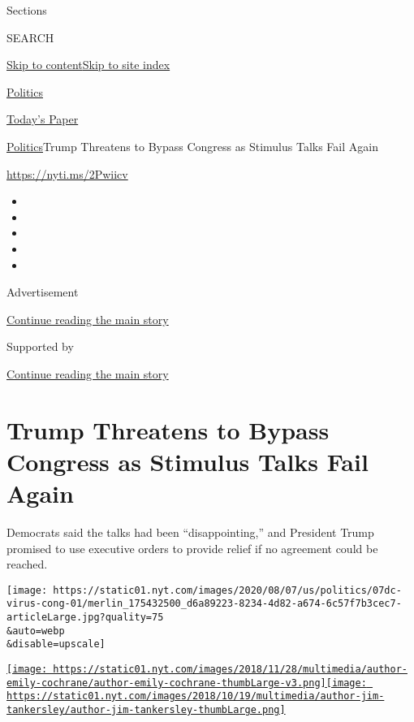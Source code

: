 Sections

SEARCH

\protect\hyperlink{site-content}{Skip to
content}\protect\hyperlink{site-index}{Skip to site index}

\href{https://www.nytimes.com/section/politics}{Politics}

\href{https://myaccount.nytimes.com/auth/login?response_type=cookie\&client_id=vi}{}

\href{https://www.nytimes.com/section/todayspaper}{Today's Paper}

\href{/section/politics}{Politics}\textbar{}Trump Threatens to Bypass
Congress as Stimulus Talks Fail Again

\href{https://nyti.ms/2Pwiicv}{https://nyti.ms/2Pwiicv}

\begin{itemize}
\item
\item
\item
\item
\item
\end{itemize}

Advertisement

\protect\hyperlink{after-top}{Continue reading the main story}

Supported by

\protect\hyperlink{after-sponsor}{Continue reading the main story}

\hypertarget{trump-threatens-to-bypass-congress-as-stimulus-talks-fail-again}{%
\section{Trump Threatens to Bypass Congress as Stimulus Talks Fail
Again}\label{trump-threatens-to-bypass-congress-as-stimulus-talks-fail-again}}

Democrats said the talks had been ``disappointing,'' and President Trump
promised to use executive orders to provide relief if no agreement could
be reached.

\texttt{[image: https://static01.nyt.com/images/2020/08/07/us/politics/07dc-virus-cong-01/merlin\_175432500\_d6a89223-8234-4d82-a674-6c57f7b3cec7-articleLarge.jpg?quality=75\\\&auto=webp\\\&disable=upscale]}

\href{https://www.nytimes.com/by/emily-cochrane}{\texttt{[image: https://static01.nyt.com/images/2018/11/28/multimedia/author-emily-cochrane/author-emily-cochrane-thumbLarge-v3.png]}}\href{https://www.nytimes.com/by/jim-tankersley}{\texttt{[image: https://static01.nyt.com/images/2018/10/19/multimedia/author-jim-tankersley/author-jim-tankersley-thumbLarge.png]}}

